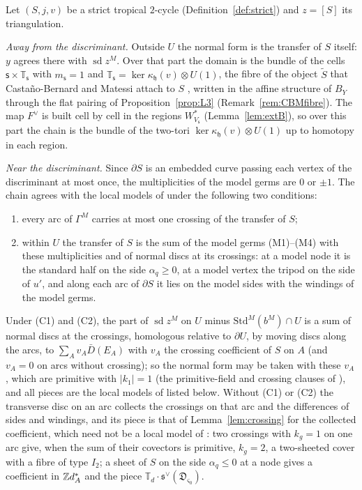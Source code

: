 \begin{remark}\label{rem:CBMlift}
Let $(S,j,v)$ be a strict tropical $2$-cycle (Definition~\ref{def:strict}) and $z=[S]$ its triangulation.

\emph{Away from the discriminant.} Outside $U$ the normal form is the transfer of $S$ itself: $y$ agrees there with
$\operatorname{sd}z^M$. Over that part the domain is the bundle of the cells $\mathsf s\times\mathbb T_{\mathsf s}$ with $m_{\mathsf s}=1$
and $\mathbb T_{\mathsf s}=\ker\kappa_{\mathfrak h}(v)\otimes U(1)$, the fibre of the object $\widetilde S$ that Casta\~no-Bernard and Matessi
attach to $S$ \cite[\S7, (46)]{CBM}, written in the affine structure of $B_Y$ through the flat pairing of
Proposition~\ref{prop:L3} (Remark~\ref{rem:CBMfibre}). The map $F^\vee$ is built cell by cell in the regions
$W^*_{V_{\mathsf s}}$ (Lemma~\ref{lem:extB}), so over this part the chain is the bundle of the two-tori $\ker\kappa_{\mathfrak h}(v)\otimes U(1)$
up to homotopy in each region.

\emph{Near the discriminant.} Since $\partial S$ is an embedded curve passing each vertex of the discriminant at most once,
the multiplicities of the model germs are $0$ or $\pm1$. The chain agrees with the local models of \cite{CBM} under the
following two conditions:
\begin{enumerate}
\item[(C1)] every arc of $\Gamma^M$ carries at most one crossing of the transfer of $S$;
\item[(C2)] within $U$ the transfer of $S$ is the sum of the model germs (M1)--(M4) with these multiplicities and of normal
discs at its crossings: at a model node it is the standard half on the side $\alpha_q\ge0$, at a model vertex the tripod on
the side of $u'$, and along each arc of $\partial S$ it lies on the model sides with the windings of the model germs.
\end{enumerate}
Under (C1) and (C2), the part of $\operatorname{sd}z^M$ on $U$ minus $\mathrm{Std}^M(b^M)\cap U$ is a sum of normal discs at the crossings, homologous relative to
$\partial U$, by moving discs along the arcs, to $\sum_Av_A\bar D(E_A)$ with $v_A$ the crossing coefficient of $S$ on $A$
(and $v_A=0$ on arcs without crossing); so the normal form may be taken with these $v_A$, which are primitive with
$|k_1|=1$ (the primitive-field and crossing clauses of \cite[Def.~7.2]{CBM}), and all pieces are the local models of \cite{CBM} listed below. Without (C1) or (C2) the
transverse disc on an arc collects the crossings on that arc and the differences of sides and windings, and its piece is
that of Lemma~\ref{lem:crossing} for the collected coefficient, which need not be a local model of \cite{CBM}: two crossings
with $k_g=1$ on one arc give, when the sum of their covectors is primitive, $k_g=2$, a two-sheeted cover with a fibre of
type $I_2$; a sheet of $S$ on the side $\alpha_q\le0$ at
a node gives a coefficient in $\mathbb Z d^*_A$ and the piece $\mathbb T_d\cdot\mathfrak s^\vee(\mathfrak D_{\varsigma_0})$.


\end{remark}
